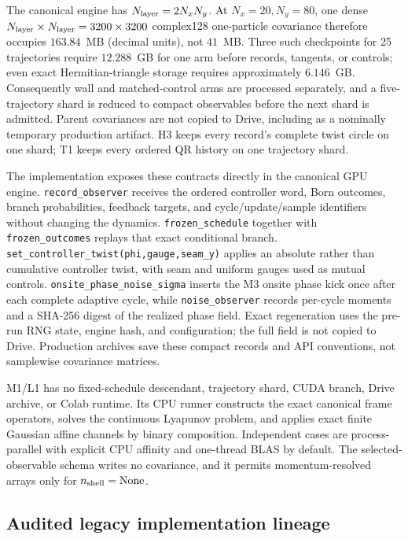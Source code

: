 \documentclass[aps,prx,twocolumn,floatfix,nofootinbib,superscriptaddress,longbibliography]{revtex4-2}
\newcommand{\code}[1]{\texttt{#1}}
\begin{document}
The canonical engine has $N_{\rm layer}=2N_xN_y$.  At $N_x=20,N_y=80$, one dense
$N_{\rm layer}\times N_{\rm layer}=3200\times3200$ complex128 one-particle covariance
therefore occupies $163.84$~MB (decimal units), not $41$~MB.  Three such checkpoints for
25 trajectories require $12.288$~GB for one arm before records, tangents, or controls;
even exact Hermitian-triangle storage requires approximately $6.146$~GB.  Consequently
wall and matched-control arms are processed separately, and a five-trajectory shard is
reduced to compact observables before the next shard is admitted.  Parent covariances are
not copied to Drive, including as a nominally temporary production artifact.  H3 keeps
every record's complete twist circle on one shard; T1 keeps every ordered QR history on one
trajectory shard.

The implementation exposes these contracts directly in the canonical GPU engine.
\code{record\_observer} receives the ordered controller word, Born outcomes, branch
probabilities, feedback targets, and cycle/update/sample identifiers without changing the
dynamics.  \code{frozen\_schedule} together with \code{frozen\_outcomes} replays that exact
conditional branch.  \code{set\_controller\_twist(phi,gauge,seam\_y)} applies an absolute
rather than cumulative controller twist, with seam and uniform gauges used as mutual
controls.  \code{onsite\_phase\_noise\_sigma} inserts the M3 onsite phase kick once after
each complete adaptive cycle, while \code{noise\_observer} records per-cycle moments and a
SHA-256 digest of the realized phase field.  Exact regeneration uses the pre-run RNG state,
engine hash, and configuration; the full field is not copied to Drive.  Production
archives save these compact records and API conventions, not samplewise
covariance matrices.

M1/L1 has no fixed-schedule descendant, trajectory shard, CUDA branch, Drive archive, or
Colab runtime.  Its CPU runner constructs the exact canonical frame operators, solves the
continuous Lyapunov problem, and applies exact finite Gaussian affine channels by binary
composition.  Independent cases are process-parallel with explicit CPU affinity and
one-thread BLAS by default.  The selected-observable schema writes no covariance, and it
permits momentum-resolved arrays only for $n_{\rm shell}=\mathrm{None}$.

\subsection{Audited legacy implementation lineage}
\end{document}

